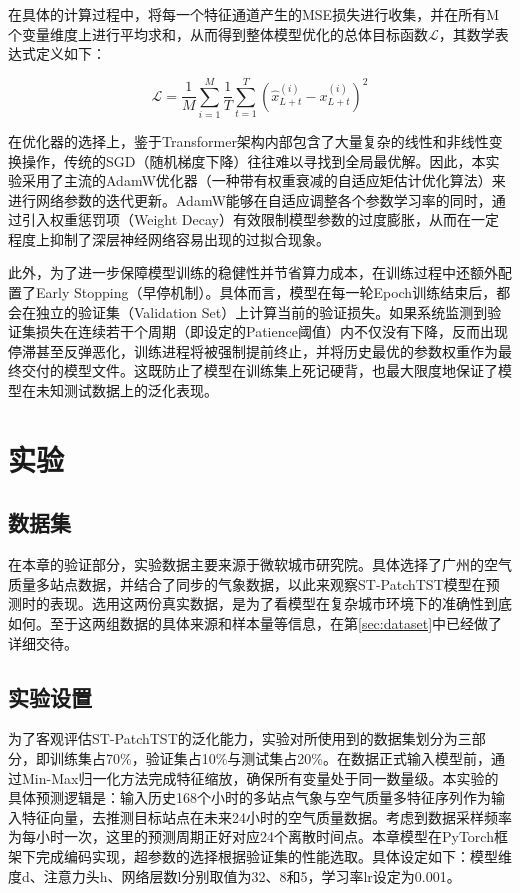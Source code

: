 在具体的计算过程中，将每一个特征通道产生的MSE损失进行收集，并在所有M个变量维度上进行平均求和，从而得到整体模型优化的总体目标函数$\mathcal{L}$，其数学表达式定义如下：

\begin{equation}\label{eq:mse_loss}
\mathcal{L} = \frac{1}{M} \sum_{i=1}^{M} \frac{1}{T} \sum_{t=1}^{T} (\hat{x}^{(i)}_{L+t} - x^{(i)}_{L+t})^2
\end{equation}

在优化器的选择上，鉴于Transformer架构内部包含了大量复杂的线性和非线性变换操作，传统的SGD（随机梯度下降）往往难以寻找到全局最优解。因此，本实验采用了主流的AdamW优化器（一种带有权重衰减的自适应矩估计优化算法）来进行网络参数的迭代更新。AdamW能够在自适应调整各个参数学习率的同时，通过引入权重惩罚项（Weight Decay）有效限制模型参数的过度膨胀，从而在一定程度上抑制了深层神经网络容易出现的过拟合现象。

此外，为了进一步保障模型训练的稳健性并节省算力成本，在训练过程中还额外配置了Early Stopping（早停机制）。具体而言，模型在每一轮Epoch训练结束后，都会在独立的验证集（Validation Set）上计算当前的验证损失。如果系统监测到验证集损失在连续若干个周期（即设定的Patience阈值）内不仅没有下降，反而出现停滞甚至反弹恶化，训练进程将被强制提前终止，并将历史最优的参数权重作为最终交付的模型文件。这既防止了模型在训练集上死记硬背，也最大限度地保证了模型在未知测试数据上的泛化表现。

\section{实验}

\subsection{数据集}

在本章的验证部分，实验数据主要来源于微软城市研究院。具体选择了广州的空气质量多站点数据，并结合了同步的气象数据，以此来观察ST-PatchTST模型在预测时的表现。选用这两份真实数据，是为了看模型在复杂城市环境下的准确性到底如何。至于这两组数据的具体来源和样本量等信息，在第\cref{sec:dataset}中已经做了详细交待。

\subsection{实验设置}


为了客观评估ST-PatchTST的泛化能力，实验对所使用到的数据集划分为三部分，即训练集占70\%，验证集占10\%与测试集占20\%。在数据正式输入模型前，通过Min-Max归一化方法完成特征缩放，确保所有变量处于同一数量级。本实验的具体预测逻辑是：输入历史168个小时的多站点气象与空气质量多特征序列作为输入特征向量，去推测目标站点在未来24小时的空气质量数据。考虑到数据采样频率为每小时一次，这里的预测周期正好对应24个离散时间点。本章模型在PyTorch框架下完成编码实现，超参数的选择根据验证集的性能选取。具体设定如下：模型维度d、注意力头h、网络层数l分别取值为32、8和5，学习率lr设定为0.001。

